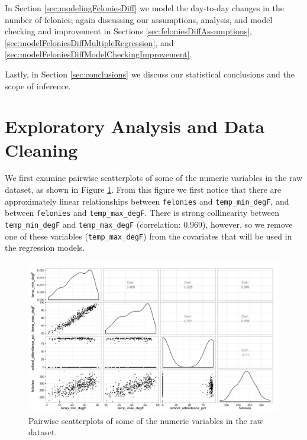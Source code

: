 \documentclass[11pt,notitlepage]{article}
\begin{document}
In Section \ref{sec:modelingFeloniesDiff} we model the day-to-day changes in the number of felonies; again discussing our assumptions, analysis, and model checking and improvement in Sections \ref{sec:feloniesDiffAssumptions}, \ref{sec:modelFeloniesDiffMultipleRegression}, and \ref{sec:modelFeloniesDiffModelCheckingImprovement}.

Lastly, in Section \ref{sec:conclusions} we discuss our statistical conclusions and the scope of inference.





\section{Exploratory Analysis and Data Cleaning}
\label{sec:eda}

We first examine pairwise scatterplots of some of the numeric variables in the raw dataset, as shown in Figure \ref{fig:pairsNumericExclAcc}. From this figure we first notice that there are approximately linear relationships between \texttt{felonies} and \texttt{temp_min_degF}, and between \texttt{felonies} and \texttt{temp_max_degF}. There is strong collinearity between \texttt{temp_min_degF} and \texttt{temp_max_degF} (correlation: 0.969), however, so we remove one of these variables (\texttt{temp_max_degF}) from the covariates that will be used in the regression models.

\begin{figure}[!h]
  \vspace*{-3mm}
	\centering
	\captionsetup{width=0.9\textwidth}
	\includegraphics[width=6in]{figures/pairsNumericExclAcc.png}
	\vspace*{-3mm}
	\caption{Pairwise scatterplots of some of the numeric variables in the raw dataset.}
	\label{fig:pairsNumericExclAcc}
	\vspace*{-3mm}
\end{figure}
\end{document}
